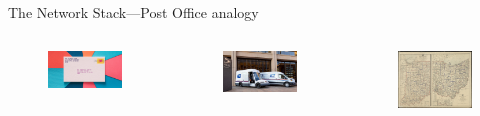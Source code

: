 \documentclass{beamer}
\begin{document}
\begin{frame}{The Network Stack---Post Office analogy}
\begin{columns}
    \begin{figure}
        \centering
        \includegraphics[height=0.5\linewidth]{../thesis_presentation/figs/envelope.jpg}
    \end{figure}
    
    \begin{figure}
        \centering
        \includegraphics[height=0.5\linewidth]{../thesis_presentation/figs/post_truck.jpg}
    \end{figure}
    
    
    \begin{figure}
        \centering
        \includegraphics[height=0.5\linewidth]{../thesis_presentation/figs/post_routes.jpg}
    \end{figure}
    

\end{columns}
\end{frame}
\end{document}
